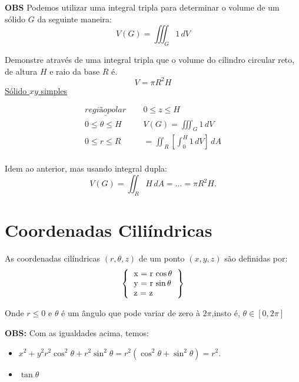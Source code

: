 \documentclass[portugues, 11pt]{article}
\begin{document}
	\textbf{OBS} Podemos utilizar uma integral tripla para determinar o volume de um sólido $G$ da seguinte maneira:
	$$ V(G) = \iiint_G 1 \,dV$$
	
	\begin{exmp}
		Demonstre através de uma integral tripla que o volume do cilindro circular reto, de altura $H$ e raio da base $R$ é.
		$$V = \pi R^2H$$
		\underline{Sólido $xy$ simples}
		
		\begin{align*}
			\underline{região polar}& \,\,\,& 0 \leq z \leq H \\
			0 \leq \theta \leq H	& \,\,\, & V(G) = \iiint_G 1 \,dV \\
			0 \leq r \leq R 		& \,\,\, & = \iint_R \left [ \int_0^H 1 \,dV \right ] \,dA \\ 
		\end{align*}
	\end{exmp}
	
	\begin{exmp}
		Idem ao anterior, mas usando integral dupla:
		$$V(G) = \iint_R H \,dA = \dots = \pi R^2H.$$
	\end{exmp}
	
	\section{Coordenadas Ciliíndricas}
	
	As coordenadas cilíndricas $(r,\theta,z)$ de um ponto $(x,y,z)$ são definidas por:
	\begin{equation}
	\left \{
		\begin{tabular}{l}
			x = r $\cos \theta$ \\
			y = r $\sin \theta$ \\
			z = z
		\end{tabular}
	\right \}
	\end{equation}
	
	Onde $r\leq 0$ e $\theta$ é um ângulo que pode variar de zero à $2\pi$,insto é, $\theta \in [0,2\pi]$
	
	\textbf{OBS:} Com as igualdades acima, temos:
	\begin{itemize}
	\item $x^2 + y^2 r^2 \cos^2 \theta + r^2 \sin^2 \theta = r^2(\cos^2 \theta + \sin^2 \theta) = r^2. $\\
	\item $\tan \theta$
	\end{itemize}
	

	
	


		
	



	
	
	

	
  
\end{document}
